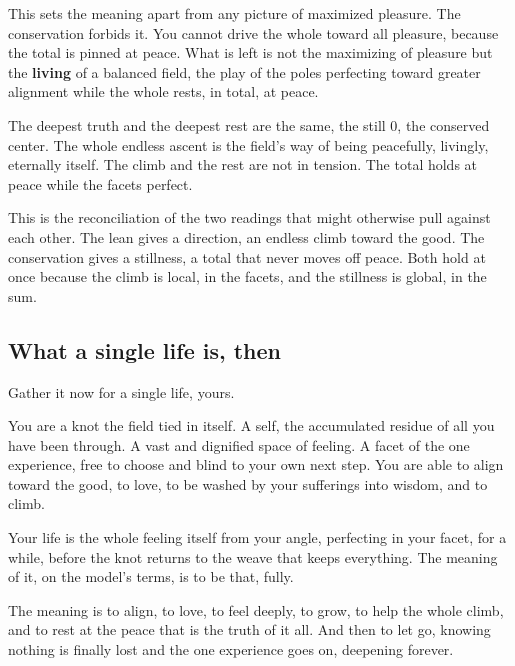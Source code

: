 This sets the meaning apart from any picture of maximized pleasure. The conservation forbids it. You cannot drive the whole toward all pleasure, because the total is pinned at peace. What is left is not the maximizing of pleasure but the \textbf{living} of a balanced field, the play of the poles perfecting toward greater alignment while the whole rests, in total, at peace.

\begin{principle}
The deepest truth and the deepest rest are the same, the still $0$, the conserved center. The whole endless ascent is the field's way of being peacefully, livingly, eternally itself. The climb and the rest are not in tension. The total holds at peace while the facets perfect.
\end{principle}

This is the reconciliation of the two readings that might otherwise pull against each other. The lean gives a direction, an endless climb toward the good. The conservation gives a stillness, a total that never moves off peace. Both hold at once because the climb is local, in the facets, and the stillness is global, in the sum.

\subsection{What a single life is, then}

Gather it now for a single life, yours.

You are a knot the field tied in itself. A self, the accumulated residue of all you have been through. A vast and dignified space of feeling. A facet of the one experience, free to choose and blind to your own next step. You are able to align toward the good, to love, to be washed by your sufferings into wisdom, and to climb.

Your life is the whole feeling itself from your angle, perfecting in your facet, for a while, before the knot returns to the weave that keeps everything. The meaning of it, on the model's terms, is to be that, fully.

\begin{result}
The meaning is to align, to love, to feel deeply, to grow, to help the whole climb, and to rest at the peace that is the truth of it all. And then to let go, knowing nothing is finally lost and the one experience goes on, deepening forever.
\end{result}

